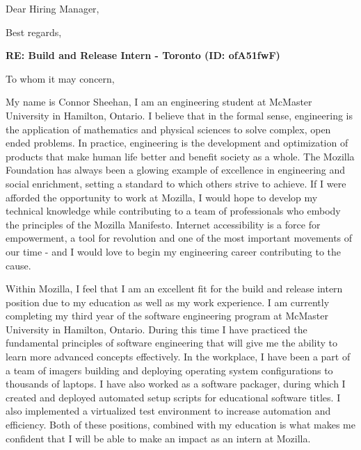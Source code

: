 \documentclass[11pt,a4paper,sans]{moderncv}        %
\newif\ifcover
\begin{document}
\ifcover
\date{January 28\textsuperscript{th}, 2016}
\opening{Dear Hiring Manager,}
\closing{Best regards,}
\makelettertitle

\textbf{RE: Build and Release Intern - Toronto (ID: ofA51fwF)}

To whom it may concern,

My name is Connor Sheehan, I am an engineering student at McMaster University in Hamilton, Ontario. I believe that in the formal sense, engineering is the application of mathematics and physical sciences to solve complex, open ended problems. In practice, engineering is the development and optimization of products that make human life better and benefit society as a whole. The Mozilla Foundation has always been a glowing example of excellence in engineering  and social enrichment, setting a standard to which others strive to achieve. If I were afforded the opportunity to work at Mozilla, I would hope to develop my technical knowledge while contributing to a team of professionals who embody the principles of the Mozilla Manifesto. Internet accessibility is a force for empowerment, a tool for revolution and one of the most important movements of our time - and I would love to begin my engineering career contributing to the cause.

Within Mozilla, I feel that I am an excellent fit for the build and release intern position due to my education as well as my work experience. I am currently completing my third year of the software engineering program at McMaster University in Hamilton, Ontario. During this time I have practiced the fundamental principles of software engineering that will give me the ability to learn more advanced concepts effectively. In the workplace, I have been a part of a team of imagers building and deploying operating system configurations to thousands of laptops. I have also worked as a software packager, during which I created and deployed automated setup scripts for educational software titles. I also implemented a virtualized test environment to increase automation and efficiency. Both of these positions, combined with my education is what makes me confident that I will be able to make an impact as an intern at Mozilla.
\end{document}
